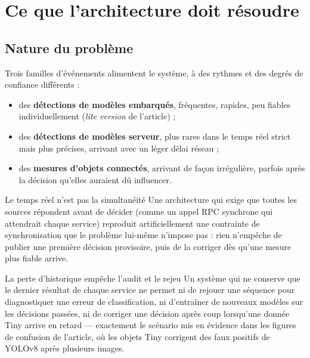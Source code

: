\documentclass[11pt,a4paper]{article}
\begin{document}
\section{Ce que l'architecture doit résoudre}

\subsection{Nature du problème}

Trois familles d'événements alimentent le système, à des rythmes et des degrés de confiance
différents :

\begin{itemize}[leftmargin=1.2cm]
  \item des \textbf{détections de modèles embarqués}, fréquentes, rapides, peu fiables
  individuellement (\emph{lite version} de l'article) ;
  \item des \textbf{détections de modèles serveur}, plus rares dans le temps réel strict mais
  plus précises, arrivant avec un léger délai réseau ;
  \item des \textbf{mesures d'objets connectés}, arrivant de façon irrégulière, parfois
  après la décision qu'elles auraient dû influencer.
\end{itemize}

\begin{probleme}{Le temps réel n'est pas la simultanéité}
Une architecture qui exige que toutes les sources répondent avant de décider (comme un appel
RPC synchrone qui attendrait chaque service) reproduit artificiellement une contrainte de
synchronisation que le problème lui-même n'impose pas : rien n'empêche de publier une première
décision provisoire, puis de la corriger dès qu'une mesure plus fiable arrive.
\end{probleme}

\begin{probleme}{La perte d'historique empêche l'audit et le rejeu}
Un système qui ne conserve que le dernier résultat de chaque service ne permet ni de rejouer
une séquence pour diagnostiquer une erreur de classification, ni d'entraîner de nouveaux
modèles sur les décisions passées, ni de corriger une décision après coup lorsqu'une donnée
Tiny arrive en retard --- exactement le scénario mis en évidence dans les figures de confusion
de l'article, où les objets Tiny corrigent des faux positifs de YOLOv8 après plusieurs images.
\end{probleme}
\end{document}
